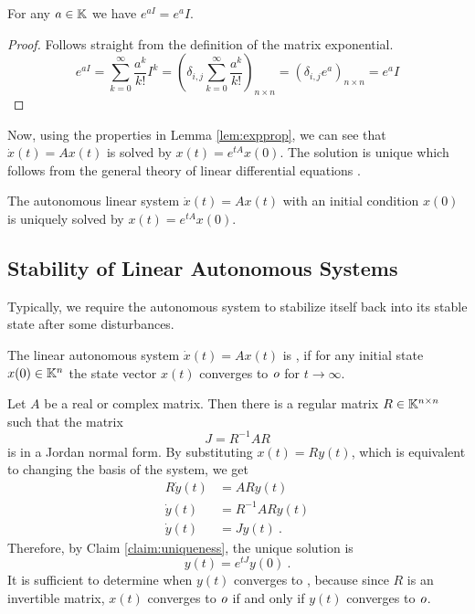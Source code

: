 \begin{lemma}
	\label{lem:matrixExpIdentity}
	For any $a\in\mathbb{K}$ we have $e^{a I}=e^{a}I$.
\end{lemma}

\begin{proof}
	Follows straight from the definition of the matrix exponential.
	$$e^{a I}=\sum^\infty_{k=0}\frac{a^k}{k!}I^k=\left(\delta_{i,j}\sum^\infty_{k=0}\frac{a^k}{k!}\right)_{n\times n}=\left(\delta_{i,j}e^a\right)_{n\times n}=e^aI$$
\end{proof}

Now, using the properties in Lemma \ref{lem:expprop}, we can see that $\dot{x}(t)=Ax(t)$ is solved by $x(t)=e^{tA}x(0)$. The solution is unique which follows from the general theory of linear differential equations \cite[see][Věta 13.5.1]{Pick}.

\begin{claim}
\label{claim:uniqueness}
	The autonomous linear system $\dot{x}(t)=Ax(t)$ with an initial condition $x(0)$ is uniquely solved by $x(t)=e^{tA}x(0)$.
\end{claim}

\subsection{Stability of Linear Autonomous Systems}

Typically, we require the autonomous system to stabilize itself back into its stable state after some disturbances.

\begin{definition}
	The linear autonomous system $\dot{x}(t)=Ax(t)$ is , if for any initial state $x(0)\in\mathbb{K}^n$ the state vector $x(t)$ converges to $\textit{o}$ for $t\to\infty$.
\end{definition}

Let $A$ be a real or complex matrix. Then there is a regular matrix $R\in \mathbb{K}^{n\times n}$ such that the matrix
$$J=R^{-1}AR$$
is in a Jordan normal form. By substituting $x(t)=Ry(t)$, which is equivalent to changing the basis of the system, we get 
\begin{align*}
	R\dot{y}(t)&=ARy(t) \\
	\dot{y}(t)&=R^{-1}ARy(t) \\
	\dot{y}(t)&=Jy(t)\ .
\end{align*}
Therefore, by Claim \ref{claim:uniqueness}, the unique solution is
$$y(t)=e^{tJ}y(0)\ .$$
It is sufficient to determine when $y(t)$ converges to \nullvector, because since $R$ is an invertible matrix, $x(t)$ converges to $\textit{o}$ if and only if $y(t)$ converges to $\textit{o}$.

